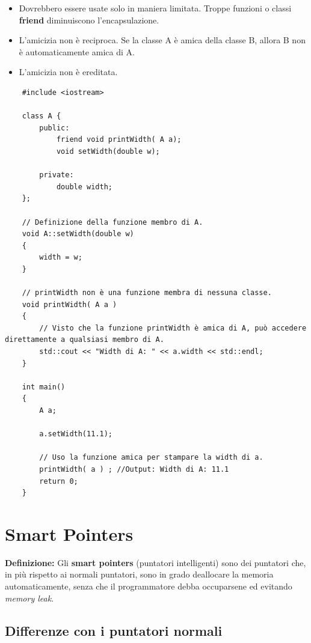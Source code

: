 \begin{itemize}
	\item \textsf{\small Dovrebbero essere usate solo in maniera limitata. Troppe funzioni o classi \textbf{friend} diminuiscono l'encapsulazione.}
	\item \textsf{\small L'amicizia non è reciproca. Se la classe A è amica della classe B, allora B non è automaticamente amica di A.}
	\item \textsf{\small L'amicizia non è ereditata.}
\end{itemize}

\begin{lstlisting}
	#include <iostream>
	
	class A {
		public:
			friend void printWidth( A a);
			void setWidth(double w);
			
		private:
			double width;
	};

	// Definizione della funzione membro di A.
	void A::setWidth(double w)
	{
		width = w;
	}

	// printWidth non è una funzione membra di nessuna classe.
	void printWidth( A a )
	{
		// Visto che la funzione printWidth è amica di A, può accedere direttamente a qualsiasi membro di A.
		std::cout << "Width di A: " << a.width << std::endl;
	}

	int main()
	{
		A a;
		
		a.setWidth(11.1);
		
		// Uso la funzione amica per stampare la width di a.
		printWidth( a ) ; //Output: Width di A: 11.1
		return 0;
	}
\end{lstlisting}


\newpage

\section{Smart Pointers}

\textsf{\small \textbf{Definizione: } Gli \textbf{smart pointers} (puntatori intelligenti) sono dei puntatori che, in più rispetto ai normali puntatori, sono in grado deallocare la memoria automaticamente, senza che il programmatore debba occuparsene ed evitando \emph{memory leak}.} \\

\subsection{Differenze con i puntatori normali}

